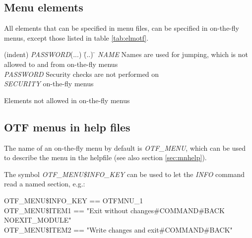\documentclass[a4paper]{book}
\renewcommand{\indent}{\hspace*{5mm}}
\begin{document}
\subsection{Menu elements}
\label{subsubsec:mylabel65}

All elements that can be specified in menu files, can be specified in 
on-the-fly menus, except those listed in table \ref{tab:elmotf}.

\begin{table}[h!tb]
\begin{minipage}[h!tb]{\textwidth}
\begin{tabbing}
(indent) \= \textsl{PASSWORD}(...) \= (..) \= \kill
 \> \textsl{NAME}     \> Names are used for jumping, which is not \\
 \>                   \> \> allowed to and from on-the-fly menus \\
 \> \textsl{PASSWORD} \> Security checks are not performed on \\
 \> \textsl{SECURITY} \> \> on-the-fly menus \\
\end{tabbing}
\caption{Elements not allowed in on-the-fly menus}\label{tab:elmotf}
\end{minipage}
\end{table}

\subsection{OTF menus in help files}
\label{subsec:otfhelp}

The name of an on-the-fly menu by default is \textsl{OTF{\_}MENU}, which can be used to describe the menu in the helpfile (see also section \ref{sec:mnhelp}).

The symbol \textsl{OTF{\_}MENU{\$}INFO{\_}KEY} can be used to let the \textsl{INFO} command read a named section, e.g.: \\
\begin{small}
\begin{textsf}
\indent{\$} OTF{\_}MENU{\$}INFO{\_}KEY == OTFMNU{\_}1 \\
\indent{\$} OTF{\_}MENU{\$}ITEM1 == "Exit without changes{\#}COMMAND{\#}BACK NOEXIT{\_}MODULE" \\
\indent{\$} OTF{\_}MENU{\$}ITEM2 == "Write changes and exit{\#}COMMAND{\#}BACK" \\
\end{textsf}
\end{small}
\end{document}
